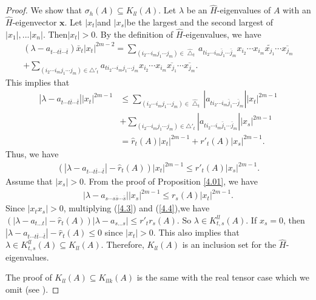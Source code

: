 \documentclass[10pt,reqno]{amsart}
\theoremstyle{definition}
\begin{document}
\begin{proof}
We show that $\sigma_h(A)\subseteq K_{ll}(A)$.
Let $\lambda$ be an $\hat{H}$-eigenvalues of $A$ with an $\hat{H}$-eigenvector $\mathbf{x}$. 
Let $|x_{t}|$and $|x_{s}|$be the largest and the second largest of $|x_{1}|,...|x_{n}|.$ Then$|x_{t}|>0.$ By the definition of $\hat{H}$-eigenvalues, we have 
\begin{align*}
(\lambda-a_{t\cdots t\bar{t}\cdots\bar{t}})\bar{x}_t|x_t|^{2m-2}=\sum_{(i_2\cdots i_mj_1\cdots j_{m})\in \hat{\bigtriangleup}_{t}} a_{ti_2\cdots i_m\bar{j}_1\cdots \bar{j}_m} x_{i_2}\cdots x_{i_m}\tilde{x_{j_1}}\cdots\overline{x_{j_m}}\\
+\sum_{(i_2\cdots i_mj_1\cdots j_{m})\in \bigtriangleup'_{t}}a_{ti_2\cdots i_mj_1\cdots j_m}  x_{i_2}\cdots x_{i_m}\overline{x_{j_1}}\cdots\overline{x_{j_m}}.\end{align*}
This implies that
\begin{align*}
|\lambda-a_{t\cdots t\bar{t}\cdots\bar{t}}||x_{t}|^{2m-1}&\leq\sum_{(i_2\cdots i_mj_1\cdots j_{m})\in \hat{\bigtriangleup}_{t}} |a_{ti_2\cdots i_m\bar{j}_1\cdots \bar{j}_m}||x_{t}|^{2m-1}\\
&+\sum_{(i_2\cdots i_mj_1\cdots j_{m})\in\bigtriangleup'_{t}}|a_{ti_2\cdots i_m\bar{j}_1\cdots \bar{j}_m}||x_{s}|^{2m-1}\\
&=\hat{r}_{t}(A)|x_{t}|^{2m-1}+r'_{t}(A)|x_{s}|^{2m-1}.
\end{align*}
Thus, we have \begin{align}(|\lambda-a_{t\cdots t\bar{t}\cdots\bar{t}}|-\hat{r}_{t}(A))|x_{t}|^{2m-1}\leq r'_{t}(A)|x_{s}|^{2m-1}.\label{4.3}\end{align}
Assume that $|x_{s}|>0.$ From the proof of Proposition \ref{4.01}, we have 
\begin{align} |\lambda-a_{s\cdots s\bar{s}\cdots\bar{s}}||x_{s}|^{2m-1}\leq r_{s}(A)|x_{t}|^{2m-1}.\label{4.4}\end{align}
Since $|x_{t}x_{s}|>0$, multiplying (\ref{4.3}) and (\ref{4.4}),we have
$(|\lambda-a_{t...t}|-\hat{r}_{t}(A))|\lambda-a_{s...s}|\leq r'_{t}r_{s}(A).$
So $\lambda\in K_{t,s}^{ll}(A).$ If $x_{s}=0$, then$|\lambda-a_{t\cdots t\bar{t}\cdots\bar{t}}|-\hat{r}_{t}(A)\leq 0 $ since $|x_{t}|>0.$ This also implies that $\lambda\in K_{t,s}^{ll}(A)\subseteq K_{ll}(A).$ Therefore, $K_{ll}(A)$ is an inclusion set for the $\hat{H}$-eigenvalues.

The proof of $K_{ll}(A)\subseteq K_{llk}(A)$ is the same with the real tensor case which we omit (see \cite{LL}).\end{proof}
\end{document}
